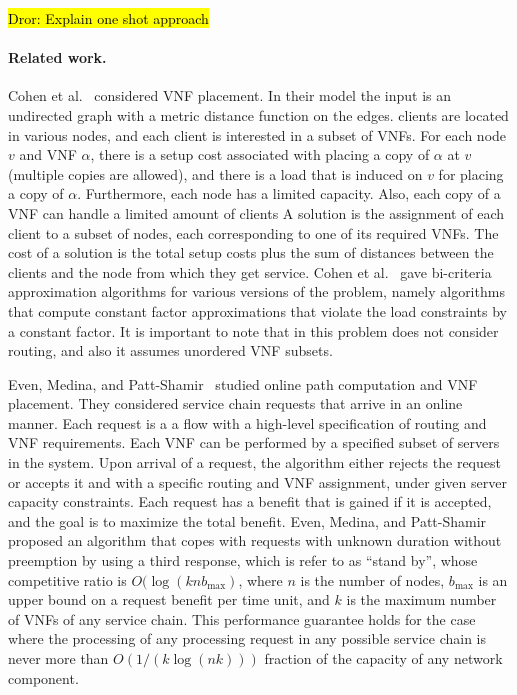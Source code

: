 \documentclass[runningheads]{llncs}
\newcommand{\dror}[1]{\sethlcolor{yellow}\hl{Dror: #1}}
\begin{document}
\dror{Explain one shot approach}

\paragraph*{\bf Related work.}
%

Cohen et al.~\cite{CLNR15} considered VNF placement.  In their model
the input is an undirected graph with a metric distance function on
the edges.  clients are located in various nodes, and each client is
interested in a subset of VNFs.  For each node $v$ and VNF $\alpha$,
there is a setup cost associated with placing a copy of $\alpha$ at
$v$ (multiple copies are allowed), and there is a load that is induced
on $v$ for placing a copy of $\alpha$.  Furthermore, each node has a
limited capacity.  Also, each copy of a VNF can handle a limited
amount of clients A solution is the assignment of each client to a
subset of nodes, each corresponding to one of its required VNFs.  The
cost of a solution is the total setup costs plus the sum of distances
between the clients and the node from which they get service.
%
Cohen et al.~\cite{CLNR15} gave bi-criteria approximation algorithms
for various versions of the problem, namely algorithms that compute
constant factor approximations that violate the load constraints by a
constant factor.
%
It is important to note that in this problem does not consider
routing, and also it assumes unordered VNF subsets.

Even, Medina, and Patt-Shamir~\cite{EMP16} studied online path
computation and VNF placement.  They considered service chain requests
that arrive in an online manner.  Each request is a a flow with a
high-level specification of routing and VNF requirements.  Each VNF
can be performed by a specified subset of servers in the system.  Upon
arrival of a request, the algorithm either rejects the request or
accepts it and with a specific routing and VNF assignment, under given
server capacity constraints.  Each request has a benefit that is
gained if it is accepted, and the goal is to maximize the total
benefit.
%
Even, Medina, and Patt-Shamir~\cite{EMP16} proposed an algorithm that
copes with requests with unknown duration without preemption by using
a third response, which is refer to as “stand by”, whose competitive
ratio is $O(\log (knb_{\max})$, where $n$ is the number of nodes,
$b_{\max}$ is an upper bound on a request benefit per time unit, and
$k$ is the maximum number of VNFs of any service chain.  This
performance guarantee holds for the case where the processing of any
processing request in any possible service chain is never more than
$O(1/(k \log (nk)))$ fraction of the capacity of any network
component.
\end{document}
